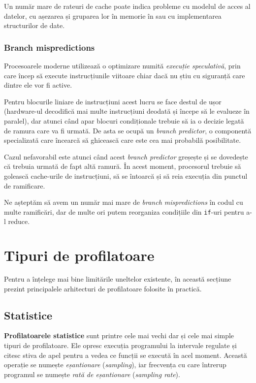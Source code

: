Un număr mare de rateuri de cache poate indica probleme cu modelul de acces al datelor, cu așezarea și gruparea lor în memorie în sau cu implementarea structurilor de date.

\subsubsection*{Branch mispredictions}

Procesoarele moderne utilizează o optimizare numită \emph{execuție speculativă}, prin care încep să execute instrucțiunile viitoare chiar dacă nu știu cu siguranță care dintre ele vor fi active.

Pentru blocurile liniare de instrucțiuni acest lucru se face destul de ușor (hardware-ul decodifică mai multe instrucțiuni deodată și începe să le evalueze în paralel), dar atunci când apar blocuri condiționale trebuie să ia o decizie legată de ramura care va fi urmată. De asta se ocupă un \emph{branch predictor}, o componentă specializată care încearcă să ghicească care este cea mai probabilă posibilitate.

Cazul nefavorabil este atunci când acest \textit{branch predictor} greșește și se dovedește că trebuia urmată de fapt altă ramură. În acest moment, procesorul trebuie să golească cache-urile de instrucțiuni, să se întoarcă și să reia execuția din punctul de ramificare.

Ne așteptăm să avem un număr mai mare de \textit{branch mispredictions} în codul cu multe ramificări, dar de multe ori putem reorganiza condițiile din \texttt{if}-uri pentru a-l reduce.

\section{Tipuri de profilatoare}

Pentru a înțelege mai bine limitările uneltelor existente, în această secțiune prezint principalele arhitecturi de profilatoare folosite în practică. 

\subsection{Statistice}

\textbf{Profilatoarele statistice} sunt printre cele mai vechi dar și cele mai simple tipuri de profilatoare. Ele opresc execuția programului la intervale regulate și citesc stiva de apel pentru a vedea ce funcții se execută în acel moment. Această operație se numește \emph{eșantionare} (\textit{sampling}), iar frecvența cu care întrerup programul se numește \emph{rată de eșantionare} (\textit{sampling rate}).

